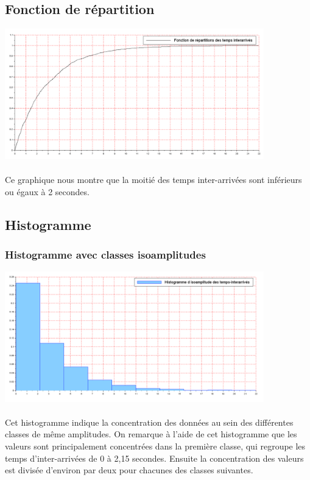 \documentclass{article}
\begin{document}
\subsection{Fonction de répartition}
\begin{center}
\includegraphics[width=425px]{img/repart.png}
\end{center}
\paragraph{}
Ce graphique nous montre que la moitié des temps inter-arrivées sont inférieurs ou égaux à 2 secondes.

\subsection{Histogramme}

\subsubsection{Histogramme avec classes isoamplitudes}
\begin{center}
\includegraphics[width=425px]{img/H_isoa.png}
\end{center}
\paragraph{}
Cet histogramme indique la concentration des données au sein des différentes classes de même amplitudes. 
On remarque à l’aide de cet histogramme que les valeurs sont principalement concentrées dans la première classe, qui regroupe les temps d'inter-arrivées de 0 à 2,15 secondes. Ensuite la concentration des valeurs est divisée d’environ par deux pour chacunes des classes suivantes.
\end{document}
